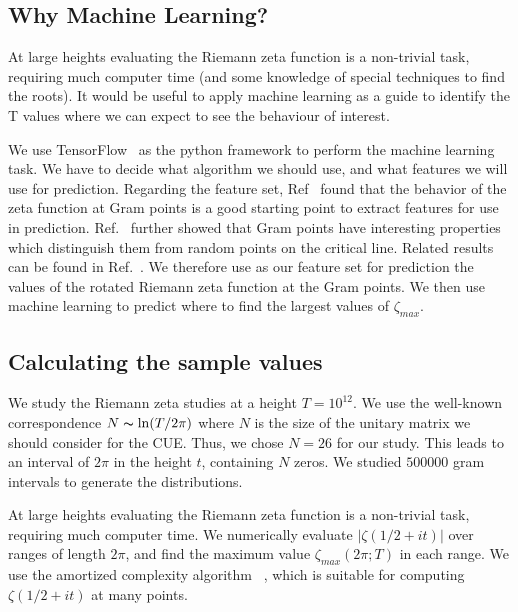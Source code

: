 \documentclass[twoside]{article}
\begin{document}
\subsection{\label{secwhy}Why Machine Learning?}

At large heights evaluating the Riemann zeta function  is a non-trivial task, requiring much computer time 
(and some knowledge of special techniques to find the roots).  It would be useful to apply
machine learning
as a guide to identify the T values where we can expect to see the behaviour of interest.

We use TensorFlow~\cite{FrancoisChollet 2021} as the python framework to perform the machine learning 
task. We have to  decide what algorithm we should use, and what features we will use for prediction.
Regarding the feature set, 
Ref~\cite{osneural} found that the behavior of the zeta function at Gram points 
is a good starting point to extract features for use in prediction. 
Ref.~\cite{Shanker 2018a} further showed that Gram points have interesting properties 
which distinguish them from random points on the critical line. 
Related  results can be found in Ref.~\cite{os6, Shanker 2018b,Shanker 2020}. We therefore
use as our feature set for prediction the values of the rotated Riemann zeta function at the Gram points.
We then use machine learning to predict where to find the largest values of $\zeta_{max}$.

\subsection{\label{seccalc}Calculating the sample values}

We study the Riemann zeta studies  at a
height $T = 10^{12}$. We use the well-known correspondence $N \thicksim \ln(T/2\pi)$ where $N$ 
is the size of the unitary matrix we should consider for the CUE. Thus, we chose $N = 26$ for our
study.  This leads to an interval of $2\pi$ in the height $t$,  containing $N$ zeros.
We studied $500000$ gram intervals  to generate the distributions.

At large heights evaluating the Riemann zeta function  is a non-trivial task, requiring much computer time. 
We numerically evaluate $|\zeta(1/2 + it)|$ over ranges of length $2\pi$, 
 and find the maximum value $\zeta_{max}(2\pi; T )$ in each range. 
 We use the amortized complexity algorithm ~\cite{hiary}, 
 which is suitable for computing $\zeta(1/2 + it)$ at many points.
\end{document}
